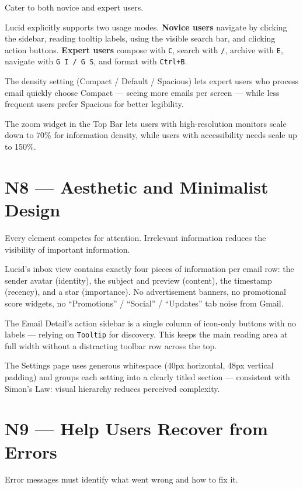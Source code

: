 \documentclass[12pt,a4paper]{report}
\begin{document}
Cater to both novice and expert users.

Lucid explicitly supports two usage modes. \textbf{Novice users} navigate by clicking the
sidebar, reading tooltip labels, using the visible search bar, and clicking action buttons.
\textbf{Expert users} compose with \texttt{C}, search with \texttt{/}, archive with
\texttt{E}, navigate with \texttt{G I / G S}, and format with \texttt{Ctrl+B}.

The density setting (Compact / Default / Spacious) lets expert users who process email
quickly choose Compact — seeing more emails per screen — while less frequent users prefer
Spacious for better legibility.

The zoom widget in the Top Bar lets users with high-resolution monitors scale down to 70\%
for information density, while users with accessibility needs scale up to 150\%.

\section{N8 — Aesthetic and Minimalist Design}

Every element competes for attention. Irrelevant information reduces the visibility of important information.

Lucid's inbox view contains exactly four pieces of information per email row:
the sender avatar (identity), the subject and preview (content), the timestamp (recency),
and a star (importance). No advertisement banners, no promotional score widgets, no
``Promotions'' / ``Social'' / ``Updates'' tab noise from Gmail.

The Email Detail's action sidebar is a single column of icon-only buttons with no labels —
relying on \texttt{Tooltip} for discovery. This keeps the main reading area at full width
without a distracting toolbar row across the top.

The Settings page uses generous whitespace (40px horizontal, 48px vertical padding) and
groups each setting into a clearly titled section — consistent with Simon's Law: visual
hierarchy reduces perceived complexity.

\section{N9 — Help Users Recover from Errors}

Error messages must identify what went wrong and how to fix it.
\end{document}
